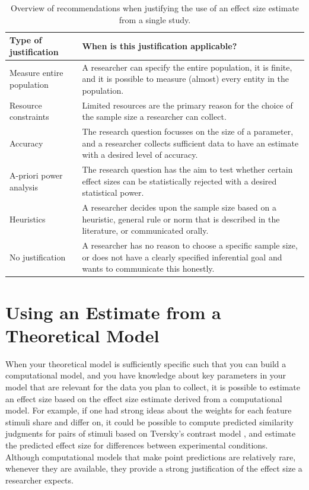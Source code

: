 \documentclass[
]{krantz}
\begin{document}
\begin{table}

\caption{\label{tab:table-es-just}Overview of recommendations when justifying the use of an effect size estimate from a single study.}
\centering
\begin{tabular}[t]{l|l}
\hline
Type of justification & When is this justification applicable?\\
\hline
Measure entire population & A researcher can specify the entire population, it is finite, and it is possible to measure (almost) every entity in the population.\\
\hline
Resource constraints & Limited resources are the primary reason for the choice of the sample size a researcher can collect.\\
\hline
Accuracy & The research question focusses on the size of a parameter, and a researcher collects sufficient data to have an estimate with a desired level of accuracy.\\
\hline
A-priori power analysis & The research question has the aim to test whether certain effect sizes can be statistically rejected with a desired statistical power.\\
\hline
Heuristics & A researcher decides upon the sample size based on a heuristic, general rule or norm that is described in the literature, or communicated orally.\\
\hline
No justification & A researcher has no reason to choose a specific sample size, or does not have a clearly specified inferential goal and wants to communicate this honestly.\\
\hline
\end{tabular}
\end{table}

\hypertarget{using-an-estimate-from-a-theoretical-model}{%
\section{Using an Estimate from a Theoretical Model}\label{using-an-estimate-from-a-theoretical-model}}

When your theoretical model is sufficiently specific such that you can build a computational model, and you have knowledge about key parameters in your model that are relevant for the data you plan to collect, it is possible to estimate an effect size based on the effect size estimate derived from a computational model. For example, if one had strong ideas about the weights for each feature stimuli share and differ on, it could be possible to compute predicted similarity judgments for pairs of stimuli based on Tversky's contrast model \citep{tversky_features_1977}, and estimate the predicted effect size for differences between experimental conditions. Although computational models that make point predictions are relatively rare, whenever they are available, they provide a strong justification of the effect size a researcher expects.
\end{document}
